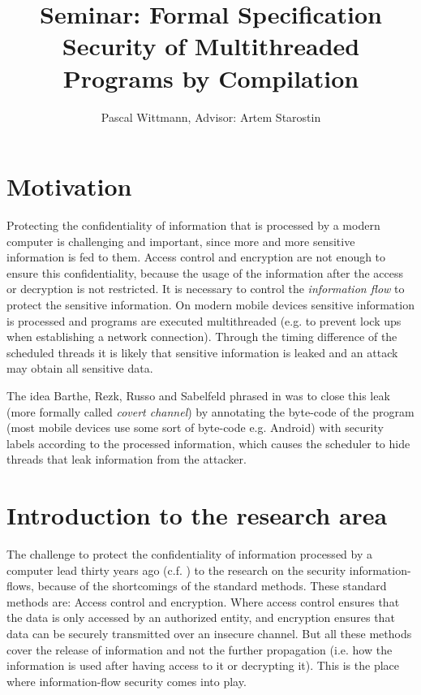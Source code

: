 \documentclass[a4paper,10pt]{llncs}
\begin{document}
\title{{\normalsize Seminar: Formal Specification} \\[1ex]
  Security of Multithreaded Programs by Compilation\cite{Barthe07}}
\author{Pascal Wittmann, Advisor: Artem Starostin}

\maketitle


\section{Motivation}
\label{sec:motivation}
Protecting the confidentiality of information that is processed by
a modern computer is challenging and important, since more and more sensitive
information is fed to them. Access control and encryption are not enough to
ensure this confidentiality, because the usage of the information after the
access or decryption is not restricted. It is necessary to control the
\textit{information flow} to protect the sensitive information.
On modern mobile devices sensitive information is processed and programs
are executed multithreaded (e.g. to prevent lock ups when establishing
a network connection). Through the timing difference of the scheduled threads it
is likely that sensitive information is leaked and an attack may obtain all
sensitive data.

The idea Barthe, Rezk, Russo and Sabelfeld phrased in \cite{Barthe07} was to close
this leak (more formally called \textit{covert channel}) by annotating the byte-code
of the program (most mobile devices use some sort of byte-code e.g. Android) with security
labels according to the processed information, which causes the scheduler to hide
threads that leak information from the attacker.

\section{Introduction to the research area}
\label{sec:introduction}
The challenge to protect the confidentiality of information processed by
a computer lead thirty years ago (c.f. \cite{Zdancewic04}) to the research
on the security information-flows, because of the shortcomings of the standard methods.
These standard methods are: Access control and encryption. Where
access control ensures that the data is only accessed by an authorized entity,
and encryption ensures that data can be securely transmitted over an insecure channel.
But all these methods cover the release of information and not the further
propagation (i.e. how the information is used after having access to it or decrypting
it). This is the place where information-flow security comes into play.
\end{document}
